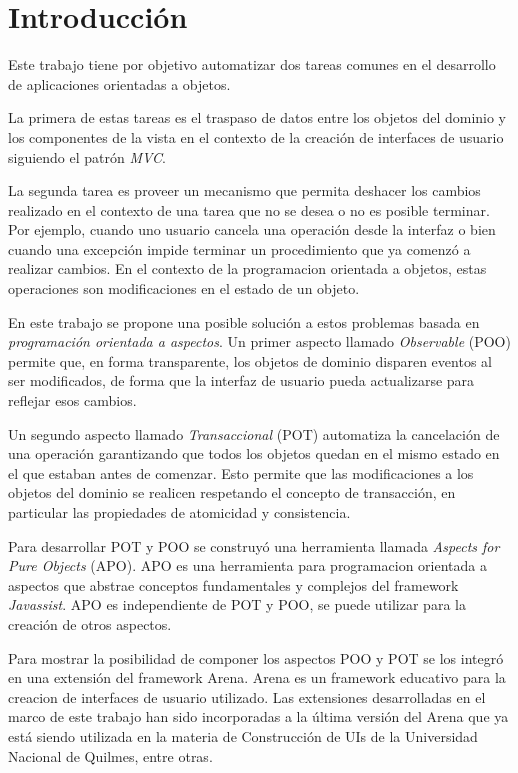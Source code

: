 \section{Introducción}

Este trabajo tiene por objetivo automatizar dos tareas comunes en el
desarrollo de aplicaciones orientadas a objetos.

La primera de estas tareas es el traspaso de datos entre los objetos del dominio
y los componentes de la vista en el contexto de la creación de interfaces de
usuario siguiendo el patrón \emph{MVC}.
 
La segunda tarea es proveer un mecanismo que permita deshacer los cambios
realizado en el contexto de una tarea que no se desea o no es posible terminar.
Por ejemplo, cuando uno usuario cancela una operación desde la interfaz o bien
cuando una excepción impide terminar un procedimiento que ya comenzó a realizar
cambios.
En el contexto de la programacion orientada a objetos, estas operaciones son
modificaciones en el estado de un objeto.


En este trabajo se propone una posible solución a estos problemas basada en
\emph{programación orientada a aspectos}.
Un primer aspecto llamado \emph{Observable} (POO) permite que, en forma
transparente, los objetos de dominio disparen eventos al ser modificados, de
forma que la interfaz de usuario pueda actualizarse para reflejar esos cambios.

Un segundo aspecto llamado \emph{Transaccional} (POT) automatiza la cancelación
de una operación garantizando que todos los objetos quedan en el mismo estado en
el que estaban antes de comenzar. Esto permite que las modificaciones a los
objetos del dominio se realicen respetando el concepto de transacción, en
particular las propiedades de atomicidad y consistencia.

Para desarrollar POT y POO se construyó una herramienta llamada
\emph{Aspects for Pure Objects} (APO).
APO es una herramienta para programacion orientada a aspectos que abstrae
conceptos fundamentales y complejos del framework \emph{Javassist}. 
APO es independiente de POT y POO, se puede utilizar
para la creación de otros aspectos.

Para mostrar la posibilidad de componer los aspectos POO y POT se los integró en
una extensión del framework Arena.
Arena es un framework educativo para la creacion de interfaces de usuario
utilizado.
Las extensiones desarrolladas en el marco de este trabajo han sido incorporadas
a la última versión del Arena que ya está siendo utilizada en la materia de
Construcción de UIs de la Universidad Nacional de Quilmes, entre otras.

